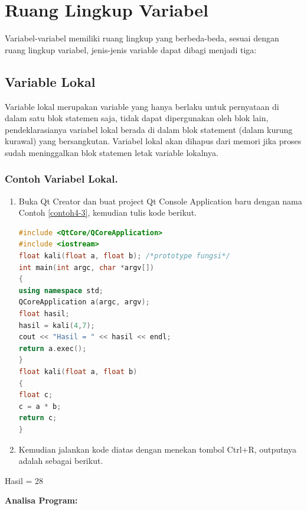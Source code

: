 \section{Ruang Lingkup Variabel}\label{ruang-lingkup-variabel}

Variabel-variabel memiliki ruang lingkup yang berbeda-beda, sesuai
dengan ruang lingkup variabel, jenis-jenis variable dapat dibagi menjadi
tiga:

\subsection{Variable Lokal}\label{variable-lokal}

Variable lokal merupakan variable yang hanya berlaku untuk pernyataan di
dalam satu blok statemen saja, tidak dapat dipergunakan oleh blok lain,
pendeklarasianya variabel lokal berada di dalam blok statement (dalam
kurung kurawal) yang bersangkutan. Variabel lokal akan dihapus dari
memori jika proses sudah meninggalkan blok statemen letak variable
lokalnya.

\subsubsection*{Contoh  Variabel Lokal.}

\begin{enumerate}

\item
  Buka Qt Creator dan buat project Qt Console Application baru dengan
  nama Contoh \ref{contoh4-3}, kemudian tulis kode berikut.

\begin{lstlisting}[language=c++, caption=Variabel Lokal, label=contoh4-3]
#include <QtCore/QCoreApplication>
#include <iostream>
float kali(float a, float b); /*prototype fungsi*/
int main(int argc, char *argv[])
{
using namespace std;
QCoreApplication a(argc, argv);
float hasil;
hasil = kali(4,7);
cout << "Hasil = " << hasil << endl;
return a.exec();
}
float kali(float a, float b)
{
float c;
c = a * b;
return c;
}
\end{lstlisting}
\item
  Kemudian jalankan kode diatas dengan menekan tombol Ctrl+R, outputnya
  adalah sebagai berikut.
\end{enumerate}

\begin{lcverbatim}
Hasil = 28
\end{lcverbatim}


\textbf{Analisa Program:}

